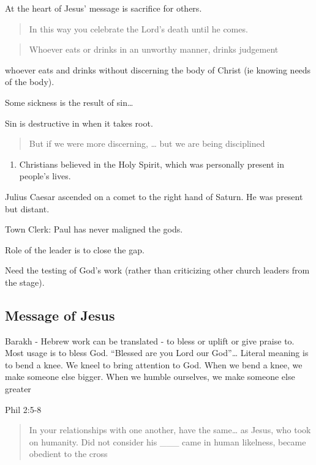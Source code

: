 \documentclass[
]{book}
\providecommand{\tightlist}{%
  \setlength{\itemsep}{0pt}\setlength{\parskip}{0pt}}
\begin{document}
At the heart of Jesus' message is sacrifice for others.

\begin{quote}
In this way you celebrate the Lord's death until he comes.
\end{quote}

\begin{quote}
Whoever eats or drinks in an unworthy manner, drinks judgement
\end{quote}

whoever eats and drinks without discerning the body of Christ (ie knowing needs of the body).

Some sickness is the result of sin\ldots{}

Sin is destructive in when it takes root.

\begin{quote}
But if we were more discerning, \ldots{} but we are being disciplined
\end{quote}

\begin{enumerate}
\def\labelenumi{\arabic{enumi})}
\setcounter{enumi}{5}
\tightlist
\item
  Christians believed in the Holy Spirit, which was personally present in people's lives.
\end{enumerate}

Julius Caesar ascended on a comet to the right hand of Saturn. He was present but distant.

Town Clerk: Paul has never maligned the gods.

Role of the leader is to close the gap.

Need the testing of God's work (rather than criticizing other church leaders from the stage).

\hypertarget{message-of-jesus}{%
\subsection{Message of Jesus}\label{message-of-jesus}}

Barakh - Hebrew work can be translated - to bless or uplift or give praise to. Most usage is to bless God. ``Blessed are you Lord our God''\ldots{} Literal meaning is to bend a knee. We kneel to bring attention to God. When we bend a knee, we make someone else bigger. When we humble ourselves, we make someone else greater

Phil 2:5-8

\begin{quote}
In your relationships with one another, have the same\ldots{} as Jesus, who took on humanity. Did not consider his \_\_\_ came in human likelness, became obedient to the cross
\end{quote}
\end{document}
